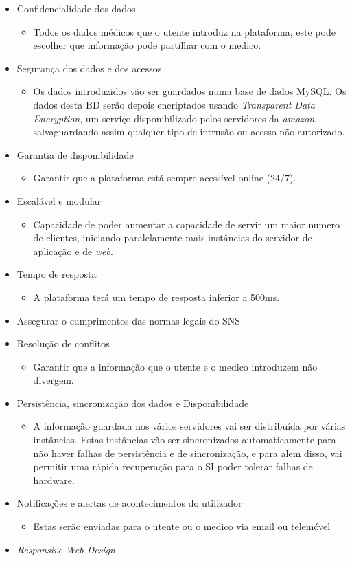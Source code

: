 \documentclass[12pt, a4paper, twoside]{report} %
\begin{document}
\begin{itemize}
\item Confidencialidade dos dados
	\begin{itemize}
	\item Todos os dados médicos que o utente introduz na plataforma, este pode escolher que informação pode partilhar com o medico.
	\end{itemize}
\item Segurança dos dados e dos acessos
	\begin{itemize}
	\item Os dados introduzidos vão ser guardados numa base de dados MySQL. Os dados desta BD serão depois encriptados usando \textit{Transparent Data Encryption}, um serviço disponibilizado pelos servidores da \textit{amazon}, salvaguardando assim qualquer tipo de intrusão ou acesso não autorizado.
	\end{itemize}
\item Garantia de disponibilidade
	\begin{itemize}
	\item Garantir que a plataforma está sempre acessível online (24/7).
	\end{itemize}
\item Escalável e modular
	\begin{itemize}
	\item Capacidade de poder aumentar a capacidade de servir um maior numero de clientes, iniciando paralelamente mais instâncias do servidor de aplicação e de \textit{web}.
	\end{itemize}
\item Tempo de resposta
	\begin{itemize}
	\item A plataforma terá um tempo de resposta inferior a 500ms.
	\end{itemize}
\item Assegurar o cumprimentos das normas legais do SNS
\item Resolução de conflitos
	\begin{itemize}
	\item Garantir que a informação que o utente e o medico introduzem não divergem.
	\end{itemize}
\item Persistência, sincronização dos dados e Disponibilidade
	\begin{itemize}
	\item A informação guardada nos vários servidores vai ser distribuída por várias instâncias. Estas instâncias vão ser sincronizados automaticamente para não haver falhas de persistência e de sincronização, e para alem disso, vai permitir uma rápida recuperação para o SI poder tolerar falhas de hardware.
	\end{itemize}
\item Notificações e alertas de acontecimentos do utilizador
\begin{itemize}
\item Estas serão enviadas para o utente ou o medico via email ou telemóvel
\end{itemize}
\item \textit {Responsive Web Design}
\end{itemize}
\end{document}
